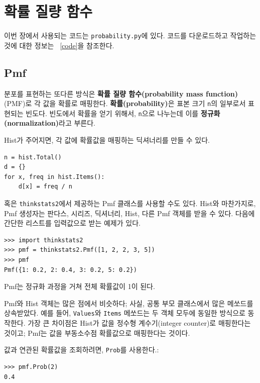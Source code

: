 \chapter{확률 질량 함수}

이번 장에서 사용되는 코드는 {\tt probability.py}에 있다.
코드를 다운로드하고 작업하는 것에 대한 정보는 ~\ref{code}을 참조한다.

\section{Pmf}

분포를 표현하는 또다른 방식은 {\bf 확률 질량 함수(probability mass function)} (PMF)로 각 값을 확률로 매핑한다. 
{\bf 확률(probability)}은 표본 크기 {\tt n}의 일부로서 표현되는 빈도다. 
빈도에서 확률을 얻기 위해서, {\tt n}으로 나누는데 이를 {\bf 정규화(normalization)}라고 부른다.


Hist가 주어지면, 각 값에 확률값을 매핑하는 딕셔너리를 만들 수 있다.

%
\begin{verbatim}
n = hist.Total()
d = {}
for x, freq in hist.Items():
    d[x] = freq / n
\end{verbatim}
%

혹은 {\tt thinkstats2}에서 제공하는 Pmf 클래스를 사용할 수도 있다.
Hist와 마찬가지로, Pmf 생성자는 판다스, 시리즈, 딕셔너리, Hist, 다른 Pmf 객체를 받을 수 있다.
다음에 간단한 리스트를 입력값으로 받는 예제가 있다.

%
\begin{verbatim}
>>> import thinkstats2
>>> pmf = thinkstats2.Pmf([1, 2, 2, 3, 5])
>>> pmf
Pmf({1: 0.2, 2: 0.4, 3: 0.2, 5: 0.2})
\end{verbatim}

Pmf는 정규화 과정을 거쳐 전체 확률값이 1이 된다.

Pmf와 Hist 객체는 많은 점에서 비슷하다; 사실, 공통 부모 클래스에서 많은 메쏘드를 상속받았다.
예를 들어, {\tt Values}와 {\tt Items} 메쏘드는 두 객체 모두에 동일한 방식으로 동작한다.
가장 큰 차이점은 Hist가 값을 정수형 계수기(integer counter)로 매핑한다는 것이고; 
Pmf는 값을 부동소수점 확률값으로 매핑한다는 것이다. 

값과 연관된 확률값을 조회하려면, {\tt Prob}를 사용한다.:
%
\begin{verbatim}
>>> pmf.Prob(2)
0.4
\end{verbatim}

